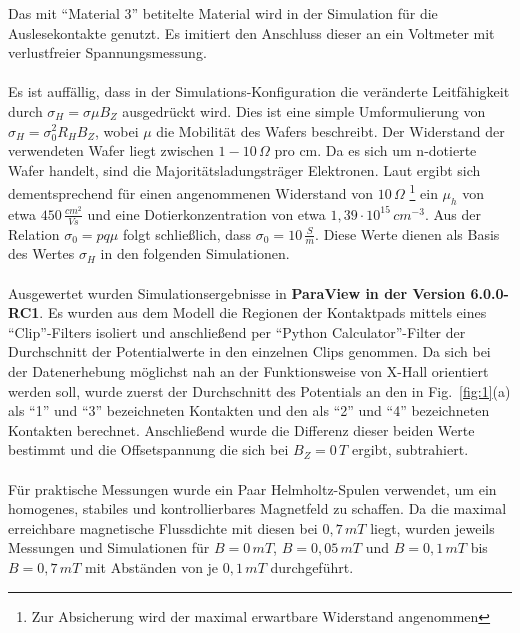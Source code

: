 \documentclass[12pt, a4paper]{article}
\begin{document}
Das mit ``Material 3'' betitelte Material wird in der Simulation für die Auslesekontakte genutzt. Es imitiert den Anschluss dieser an ein Voltmeter mit verlustfreier Spannungsmessung.\paragraph{}
Es ist auffällig, dass in der Simulations-Konfiguration die veränderte Leitfähigkeit durch $\sigma_H=\sigma\mu{B_Z}$ ausgedrückt wird. Dies ist eine simple Umformulierung von $\sigma_H=\sigma_0^2R_HB_Z$, wobei $\mu$ die Mobilität des Wafers beschreibt.\newline
Der Widerstand der verwendeten Wafer liegt zwischen $1-10\,\Omega$ pro cm. Da es sich um n-dotierte Wafer handelt, sind die Majoritätsladungsträger Elektronen. Laut \cite{bowdenDopes} ergibt sich dementsprechend für einen angenommenen Widerstand von $10\,\Omega$ \footnote{Zur Absicherung wird der maximal erwartbare Widerstand angenommen} ein $\mu_h$ von etwa $450\,\frac{cm^2}{Vs}$ und eine Dotierkonzentration von etwa $1,39\cdot10^{15}\,cm^{-3}$. Aus der Relation $\sigma_0=pq\mu$ folgt schließlich, dass $\sigma_0=10\,\frac{S}{m}$. Diese Werte dienen als Basis des Wertes $\sigma_H$ in den folgenden Simulationen.\paragraph{}
Ausgewertet wurden Simulationsergebnisse in \textbf{ParaView in der Version 6.0.0-RC1}. Es wurden aus dem Modell die Regionen der Kontaktpads mittels eines ``Clip''-Filters isoliert und anschließend per ``Python Calculator''-Filter der Durchschnitt der Potentialwerte in den einzelnen Clips genommen.\newline
Da sich bei der Datenerhebung möglichst nah an der Funktionsweise von X-Hall orientiert werden soll, wurde zuerst der Durchschnitt des Potentials an den in Fig.~\ref{fig:1}(a) als ``1'' und ``3'' bezeichneten Kontakten und den als ``2'' und ``4'' bezeichneten Kontakten berechnet. Anschließend wurde die Differenz dieser beiden Werte bestimmt und die Offsetspannung die sich bei $B_Z=0\,T$ ergibt, subtrahiert.\paragraph{}


Für praktische Messungen wurde ein Paar Helmholtz-Spulen verwendet, um ein homogenes, stabiles und kontrollierbares Magnetfeld zu schaffen. Da die maximal erreichbare magnetische Flussdichte mit diesen bei $0,7\,mT$ liegt, wurden jeweils Messungen und Simulationen für $B=0\,mT$, $B=0,05\,mT$ und $B=0,1\,mT$ bis $B=0,7\,mT$ mit Abständen von je $0,1\,mT$ durchgeführt.
\end{document}
